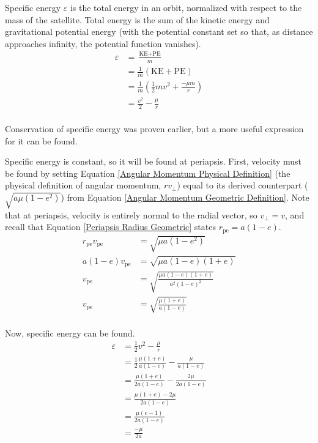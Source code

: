 \documentclass{article}
\begin{document}
Specific energy $\varepsilon$ is the total energy in an orbit, normalized with respect to the mass of the satellite. Total energy is the sum of the kinetic energy and gravitational potential energy (with the potential constant set so that, as distance approaches infinity, the potential function vanishes).
\begin{align*}
    \varepsilon & =\frac{\text{KE}+\text{PE}}{m}                             \\
                & =\frac{1}{m}(\text{KE}+\text{PE})                          \\
                & =\frac{1}{m}\left(\frac{1}{2}mv^2+\frac{-\mu{}m}{r}\right) \\
                & =\frac{v^2}{2}-\frac{\mu{}}{r}                             \\
\end{align*}

Conservation of specific energy was proven earlier, but a more useful expression for it can be found.

Specific energy is constant, so it will be found at periapsis. First, velocity must be found by setting Equation \eqref{Angular Momentum Physical Definition} (the physical definition of angular momentum, $rv_\perp$) equal to its derived counterpart ($\sqrt{a\mu(1-e^2)}$) from Equation \eqref{Angular Momentum Geometric Definition}. Note that at periapsis, velocity is entirely normal to the radial vector, so $v_\perp=v$, and recall that Equation \eqref{Periapsis Radius Geometric} states $r_\text{pe}=a(1-e)$.
\begin{align*}
    r_\text{pe}v_\text{pe} & = \sqrt{\mu{}a(1-e^2)}                       \\
    a(1-e)v_\text{pe}      & = \sqrt{\mu{}a(1-e)(1+e)}                    \\
    v_\text{pe}            & = \sqrt{\frac{\mu{}a(1-e)(1+e)}{a^2(1-e)^2}} \\
    v_\text{pe}            & = \sqrt{\frac{\mu{}(1+e)}{a(1-e)}}           \\
\end{align*}

Now, specific energy can be found.
\begin{align*}
    \varepsilon & = \frac{1}{2}v^2-\frac{\mu}{r}                            \\
                & = \frac{1}{2}\frac{\mu{}(1+e)}{a(1-e)}-\frac{\mu}{a(1-e)} \\
                & = \frac{\mu{}(1+e)}{2a(1-e)}-\frac{2\mu}{2a(1-e)}         \\
                & = \frac{\mu{}(1+e)-2\mu}{2a(1-e)}                         \\
                & = \frac{\mu{}(e-1)}{2a(1-e)}                              \\
                & = \frac{-\mu}{2a}                                         \\
\end{align*}
\end{document}
